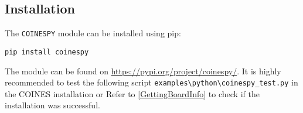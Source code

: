 \documentclass{article}
\begin{document}
\subsection{Installation}

The \texttt{COINESPY} module can be installed using pip:
\begin{lstlisting}
pip install coinespy
\end{lstlisting}
The module can be found on \url{https://pypi.org/project/coinespy/}.
It is highly recommended to test the following script \texttt{examples\textbackslash python\textbackslash coinespy\_test.py}  in the COINES installation or Refer to \ref{GettingBoardInfo} to check if the installation was successful.

\newpage
\end{document}
